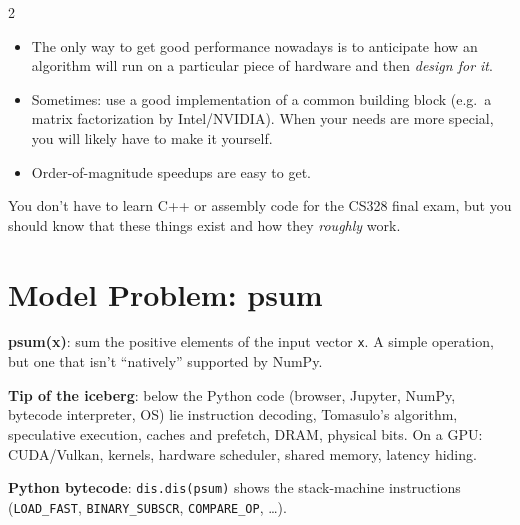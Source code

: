 \documentclass[a4paper,9pt]{extarticle}
\begin{document}
\begin{multicols}{2}
\begin{summary}
\begin{itemize}

\item The only way to get good performance nowadays is to anticipate how an algorithm will run
on a particular piece of hardware and then \emph{design for it}.

\item Sometimes: use a good implementation of a common building block (e.g.\ a matrix
factorization by Intel/NVIDIA). When your needs are more special, you will likely have to make
it yourself.

\item Order-of-magnitude speedups are easy to get.

\end{itemize}

\end{summary}


\begin{warning}

You don't have to learn C++ or assembly code for the CS328 final exam, but you should know that
these things exist and how they \emph{roughly} work.

\end{warning}



\section{Model Problem: psum}


\begin{definition}

\textbf{psum(x)}: sum the positive elements of the input vector \texttt{x}. A simple
operation, but one that isn't ``natively'' supported by NumPy.

\end{definition}


\textbf{Tip of the iceberg}: below the Python code (browser, Jupyter, NumPy, bytecode
interpreter, OS) lie instruction decoding, Tomasulo's algorithm, speculative execution, caches
and prefetch, DRAM, physical bits. On a GPU: CUDA/Vulkan, kernels, hardware scheduler, shared
memory, latency hiding.


\textbf{Python bytecode}: \texttt{dis.dis(psum)} shows the stack-machine instructions
(\texttt{LOAD\_FAST}, \texttt{BINARY\_SUBSCR}, \texttt{COMPARE\_OP}, \dots).


\begin{important}


\end{important}
\end{multicols}
\end{document}
